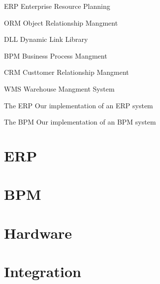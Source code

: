 \documentclass[11pt,a4paper,oneside]{bth}
\begin{document}
\begin{abbrv}
 
\item[ERP]			Enterprise Resource Planning
\item[ORM]			Object Relationship Mangment
\item[DLL]			Dynamic Link Library
\item[BPM]			Business Process Mangment
\item[CRM]			Custtomer Relationship Mangment
\item[WMS]			Warehouse Mangment System
\item[The ERP]		Our implementation of an ERP system
\item[The BPM]		Our implementation of an BPM system
 
\end{abbrv}

\newpage

\cleardoublepage
\pagestyle{headings}


    \part{ERP}
    

    \part{BPM}
    

    \part{Hardware}
    

    \part{Integration}
    
    

    \printbibliography[
      heading=bibintoc,
      title={References}
      ]
\end{document}
